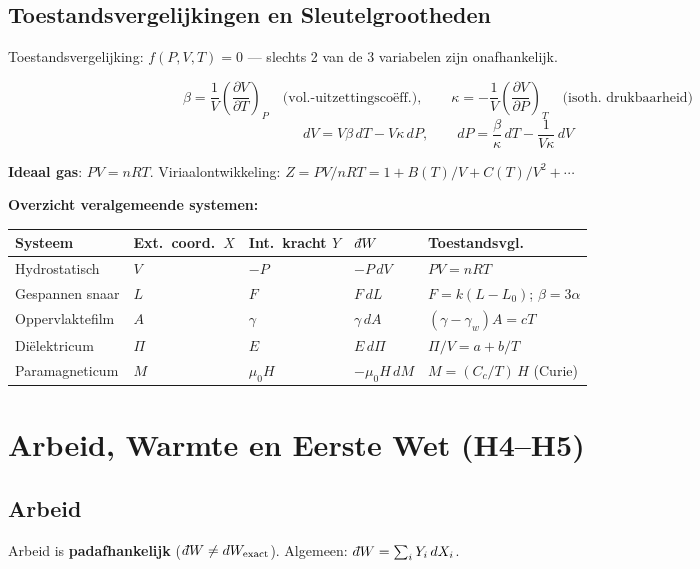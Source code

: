 \documentclass[a4paper,twoside,10pt]{article}
\theoremstyle{definition}
\newcommand{\dbar}{{\mkern+3mu\mathchar'26\mkern-12mu d}}
\newcommand{\pd}[3][]{\left(\dfrac{\partial #2}{\partial #3}\right)_{\!#1}}
\begin{document}
\subsection{Toestandsvergelijkingen en Sleutelgrootheden}

Toestandsvergelijking: $f(P,V,T)=0$ — slechts 2 van de 3 variabelen zijn onafhankelijk.

\[
  \beta = \frac{1}{V}\pd[P]{V}{T}
  \quad\text{(vol.-uitzettingscoëff.)},
  \qquad
  \kappa = -\frac{1}{V}\pd[T]{V}{P}
  \quad\text{(isoth.\ drukbaarheid)}
\]
\[
  dV = V\beta\,dT - V\kappa\,dP, \qquad dP = \frac{\beta}{\kappa}\,dT - \frac{1}{V\kappa}\,dV
\]

\textbf{Ideaal gas}: $PV = nRT$.\quad
Viriaalontwikkeling: $Z = PV/nRT = 1 + B(T)/V + C(T)/V^2 + \cdots$

\textbf{Overzicht veralgemeende systemen:}
\begin{center}
\renewcommand{\arraystretch}{1.2}
\begin{tabular}{@{}lllll@{}}
\toprule
Systeem & Ext.\ coord.\ $X$ & Int.\ kracht $Y$ & $\dbar W$ & Toestandsvgl. \\
\midrule
Hydrostatisch   & $V$   & $-P$      & $-P\,dV$        & $PV = nRT$ \\
Gespannen snaar & $L$   & $F$       & $F\,dL$         & $F=k(L-L_0)$;\; $\beta=3\alpha$ \\
Oppervlaktefilm & $A$   & $\gamma$  & $\gamma\,dA$    & $(\gamma-\gamma_w)A = cT$ \\
Diëlektricum    & $\Pi$ & $E$       & $E\,d\Pi$       & $\Pi/V = a + b/T$ \\
Paramagneticum  & $M$   & $\mu_0 H$ & $-\mu_0 H\,dM$ & $M = (C_c/T)\,H$ (Curie) \\
\bottomrule
\end{tabular}
\end{center}

\section{Arbeid, Warmte en Eerste Wet (H4--H5)}

\subsection{Arbeid}

Arbeid is \textbf{padafhankelijk} ($\dbar W \neq dW_{\text{exact}}$).\quad
Algemeen: $\dbar W = \sum_i Y_i\,dX_i$.
\end{document}
